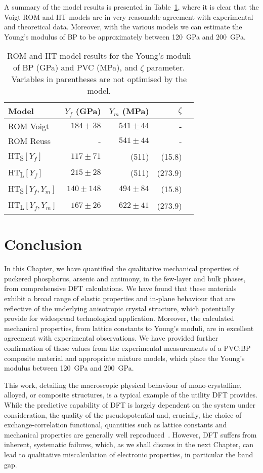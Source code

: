 A summary of the model results 
is presented in Table~\ref{table:model_results}, 
where it is clear that the 
Voigt ROM and HT models 
are in very reasonable agreement
with experimental and theoretical data.
%
Moreover, 
with the various models we can estimate  
the Young's modulus of BP to be 
approximately between 
120~GPa and 200~GPa.
%
\begin{table}[th!]
\centering
\begin{tabular}{lrrrr}
\hline\hline
Model&$Y_f$ (GPa) &$Y_m$ (MPa)&$\zeta$\\
\hline
ROM Voigt				&$184\pm38$	&$541\pm44$	&-\\
ROM Reuss				&-			&$541\pm44$ 	&-\\
HT\textsubscript{S}$[Y_f]$	&$117\pm71$	&(511) 	&(15.8)\\
HT\textsubscript{L}$[Y_f]$		&$215\pm28$	&(511) 	&(273.9)\\
HT\textsubscript{S}$[Y_f,Y_m]$&$140\pm148$	&$494\pm84$	    	&(15.8)\\
HT\textsubscript{L}$[Y_f,Y_m]$	&$167\pm26$	&$622\pm41$	    	&(273.9)\\
\hline\hline
\end{tabular}
\caption{
ROM and HT model results 
for the Young's moduli of BP (GPa) and PVC (MPa), 
and $\zeta$ parameter.
%
Variables in parentheses 
are not optimised by the model.
}
\label{table:model_results}
\end{table}


\newpage
\section{Conclusion}
\label{sec:2d_conclusion1}
%
In this Chapter, 
we have quantified the qualitative mechanical properties 
of puckered 
phosphorus, arsenic and antimony, 
in the few-layer and bulk phases, 
from comprehensive 
DFT calculations.
%
We have found that these materials exhibit 
a broad range of elastic properties 
and in-plane behaviour 
that are reflective of the underlying 
anisotropic crystal structure, 
which potentially provide for widespread 
technological application.
%
Moreover, 
the calculated mechanical properties, 
from lattice constants to Young's moduli, 
are in excellent agreement  
with experimental observations.
%
We have provided further confirmation 
of these values  
from the experimental measurements 
of a PVC:BP composite material
and appropriate mixture models, 
which place the Young's modulus 
between 120~GPa and 200~GPa.

This work, 
detailing the macroscopic physical 
behaviour of 
mono-crystalline, alloyed,
or composite structures, 
is a typical example of 
the utility DFT provides.
%
While the predictive capability of DFT 
is largely dependent on 
the system under consideration, 
the quality of the pseudopotential 
and, crucially, 
the choice of exchange-correlation functional, 
quantities such as lattice constants 
and mechanical properties are generally 
well reproduced~\cite{MUSIC2016178}.
%
However, 
DFT suffers from inherent, systematic failures, which, 
as we shall discuss in the next Chapter, 
can lead to qualitative miscalculation 
of electronic properties, 
in particular the band gap.
%


